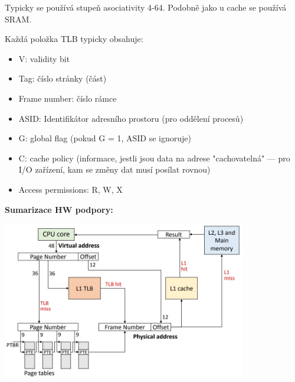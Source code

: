 Typicky se používá stupeň asociativity 4-64. Podobně jako u cache se používá SRAM.

Každá položka TLB typicky obsahuje:
\begin{itemize}
	\item V: validity bit
	\item Tag: číslo stránky (část)
	\item Frame number: číslo rámce
	\item ASID: Identifikátor adresního prostoru (pro oddělení procesů)
	\item G: global flag (pokud G = 1, ASID se ignoruje)
	\item C: cache policy (informace, jestli jsou data na adrese "cachovatelná" --- pro I/O zařízení, kam se změny dat musí posílat rovnou)
	\item Access permissions: R, W, X
\end{itemize}

\textbf{Sumarizace HW podpory:}

\includegraphics[width=0.8\textwidth]{img/OB-6_4.jpg}